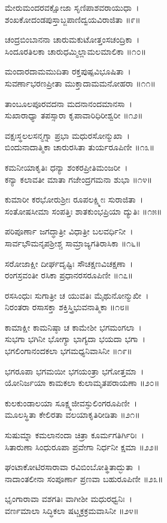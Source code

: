 	ಮೇರುಮಂದರವಕ್ಷೋಜಾ ಸೃಣಿಪಾಶವರಾಯುಧಾ~।\\
	ಶಂಖಕೋದಂಡಪುಸ್ತಾಬ್ಜಪಾಣಿದ್ವಯವಿರಾಜಿತಾ ॥೯॥

ಚಂದ್ರಬಿಂಬಾನನಾ ಚಾರುಮಕುಟೋತ್ತಂಸಚಂದ್ರಿಕಾ~।\\
ಸಿಂದೂರತಿಲಕಾ ಚಾರುಧಮ್ಮಿಲ್ಲಾಮಲಮಾಲಿಕಾ ॥೧೦॥

	ಮಂದಾರದಾಮಮುದಿತಾ ರಕ್ತಪುಷ್ಪವಿಭೂಷಿತಾ~।\\
	ಸುವರ್ಣಾಭರಣಪ್ರೀತಾ ಮುಕ್ತಾದಾಮಮನೋಹರಾ ॥೧೧॥

ತಾಂಬೂಲಪೂರವದನಾ ಮದನಾನಂದಮಾನಸಾ~।\\
ಸುಖಾರಾಧ್ಯಾ ತಪಸ್ಸಾರಾ ಕೃಪಾವಾರಿಧಿರೀಶ್ವರೀ ॥೧೨॥

	ವಕ್ಷಃಸ್ಥಲಲಸನ್ಮಗ್ನಾ ಪ್ರಭಾ ಮಧುರಸೋನ್ಮುಖಾ~।\\
	ಬಿಂದುನಾದಾತ್ಮಿಕಾ ಚಾರುರಸಿತಾ ತುರ್ಯರೂಪಿಣೀ ॥೧೩॥

ಕಮನೀಯಾಕೃತಿಃ ಧನ್ಯಾ ಶಂಕರಪ್ರೀತಿಮಂಜರೀ~।\\
ಕನ್ಯಾ ಕಲಾವತೀ ಮಾತಾ ಗಜೇಂದ್ರಗಮನಾ ಶುಭಾ ॥೧೪॥

	ಕುಮಾರೀ ಕರಭೋರುಶ್ರೀಃ ರೂಪಲಕ್ಷ್ಮೀಃ ಸುರಾಜಿತಾ~।\\
	ಸಂತೋಷಸೀಮಾ ಸಂಪತ್ತಿಃ ಶಾತಕುಂಭಪ್ರಿಯಾ ದ್ಯುತಿಃ ॥೧೫॥

ಪರಿಪೂರ್ಣಾ ಜಗದ್ಧಾತ್ರೀ ವಿಧಾತ್ರೀ ಬಲವರ್ಧಿನೀ~।\\
ಸಾರ್ವಭೌಮನೃಪಶ್ರೀಶ್ಚ ಸಾಮ್ರಾಜ್ಯಗತಿರಾಸಿಕಾ ॥೧೬॥

	ಸರೋಜಾಕ್ಷೀ ದೀರ್ಘದೃಷ್ಟಿಃ ಸೌಚಕ್ಷಣವಿಚಕ್ಷಣಾ~।\\
	ರಂಗಸ್ರವಂತೀ ರಸಿಕಾ ಪ್ರಧಾನರಸರೂಪಿಣೀ ॥೧೭॥

ರಸಸಿಂಧುಃ ಸುಗಾತ್ರೀ ಚ ಯುವತಿಃ ಮೈಥುನೋನ್ಮುಖೀ~।\\
ನಿರಂತರಾ ರಸಾಸಕ್ತಾ ಶಕ್ತಿಸ್ತ್ರಿಭುವನಾತ್ಮಿಕಾ ॥೧೮॥

ಕಾಮಾಕ್ಷೀ ಕಾಮನಿಷ್ಠಾ ಚ ಕಾಮೇಶೀ ಭಗಮಂಗಲಾ~।\\
ಸುಭಗಾ ಭಗಿನೀ ಭೋಗ್ಯಾ ಭಾಗ್ಯದಾ ಭಯದಾ ಭಗಾ~।\\
ಭಗಲಿಂಗಾನಂದಕಲಾ ಭಗಮಧ್ಯನಿವಾಸಿನೀ ॥೧೯॥

	ಭಗರೂಪಾ ಭಗಮಯೀ ಭಗಯಂತ್ರಾ ಭಗೋತ್ತಮಾ~।\\
	ಯೋನಿರ್ಜಯಾ ಕಾಮಕಲಾ ಕುಲಾಮೃತಪರಾಯಣಾ ॥೨೦॥

ಕುಲಕುಂಡಾಲಯಾ ಸೂಕ್ಷ್ಮಜೀವಸ್ಫುಲಿಂಗರೂಪಿಣೀ~।\\
ಮೂಲಸ್ಥಿತಾ ಕೇಲಿರತಾ ವಲಯಾಕೃತಿರೀಡಿತಾ ॥೨೧॥

	ಸುಷುಮ್ನಾ ಕಮಲಾನಂದಾ ಚಿತ್ರಾ ಕೂರ್ಮಗತಿರ್ಗಿರಿಃ~।\\
	ಸಿತಾರುಣಾ ಸಿಂಧುರೂಪಾ ಪ್ರವೇಗಾ ನಿರ್ಧನೀ ಕ್ಷಮಾ ॥೨೨॥

ಘಂಟಾಕೋಟಿರಸಾರಾವಾ ರವಿಬಿಂಬೋತ್ಥಿತಾದ್ಭುತಾ~।\\
ನಾದಾಂತಲೀನಾ ಸಂಪೂರ್ಣಾ ಪ್ರಣವಾ ಬಹುರೂಪಿಣೀ ॥೨೩॥

	ಭೃಂಗಾರಾವಾ ವಶಗತಿಃ ವಾಗೀಶೀ ಮಧುರಧ್ವನಿಃ~।\\
	ವರ್ಣಮಾಲಾ ಸಿದ್ಧಿಕಲಾ ಷಟ್ಚಕ್ರಕ್ರಮವಾಸಿನೀ ॥೨೪॥

